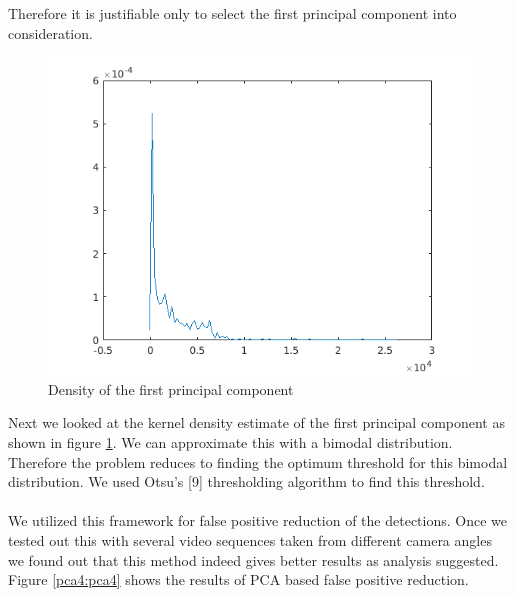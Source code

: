 \documentclass[12pt,a4paper]{report}
\begin{document}
\noindent Therefore it is justifiable only to select the first principal component into consideration. 


\begin{figure}[H]
\includegraphics[width=\textwidth]{pca/density.png}
\centering
\caption{Density of the first principal component}
\label{pca3}
\end{figure}

Next we looked at the kernel density estimate of the first principal component as shown in figure \ref{pca3}. We can approximate this with a bimodal distribution. Therefore the problem reduces to finding the optimum threshold for this bimodal distribution. We used Otsu’s [9] thresholding algorithm to find this threshold.
\\\\
We utilized this framework for false positive reduction of the detections. Once we tested out this with several video sequences taken from different camera angles we found out that this method indeed gives better results as analysis suggested. Figure \ref{pca4:pca4} shows the results of PCA based false positive reduction.\\
\end{document}

